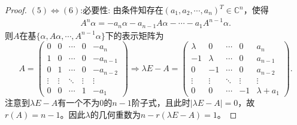 \documentclass[../../main.tex]{subfiles}%
\begin{document}
\begin{proof}
\((5)\Leftrightarrow(6)\):{\heiti 必要性:}
由条件知存在$(a_1,a_2,\cdots,a_{n})^T \in \mathbb{C}^n$，使得
\begin{align*}
A^n\alpha = -a_{n}\alpha -a_{n-1}A\alpha -\cdots -a_1A^{n-1}\alpha.
\end{align*}
则$A$在基$\{\alpha,A\alpha,\cdots,A^{n-1}\alpha\}$下的表示矩阵为
$$A=\begin{pmatrix} 0 & 0 & \cdots & 0 & -a_n \\ 1 & 0 & \cdots & 0 & -a_{n-1} \\ 0 & 1 & \cdots & 0 & -a_{n-2} \\ \vdots & \vdots & \ddots & \vdots & \vdots \\ 0 & 0 & \cdots & 1 & -a_1 \end{pmatrix} \Longrightarrow \lambda E - A = \begin{pmatrix} \lambda & 0 & \cdots & 0 & a_n \\ -1 & \lambda & \cdots & 0 & a_{n-1} \\ 0 & -1 & \cdots & 0 & a_{n-2} \\ \vdots & \vdots & \ddots & \vdots & \vdots \\ 0 & 0 & \cdots & -1 & \lambda + a_1 \end{pmatrix}.$$
注意到$\lambda E - A$有一个不为0的$n-1$阶子式，且此时$|\lambda E - A| = 0$，故$r(A) = n-1$。因此$\lambda$的几何重数为$n - r(\lambda E - A) = 1$。


\end{proof}
\end{document}
